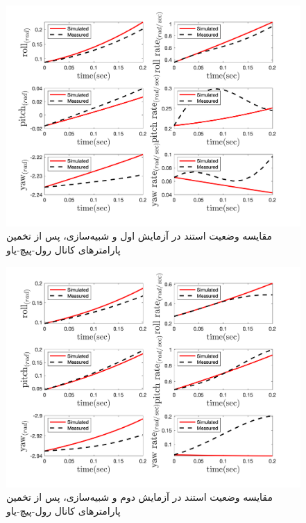 \begin{figure}[H]
	\includegraphics[width=12cm]{../Figures/RCP/roll_pitch_yaw_parameter_estimation/RCP_roll_pitch_yaw_S1.png}
	\centering
	\caption{مقايسه وضعیت استند در  آزمايش اول و شبیه‌سازی، پس از تخمین پارامترهای کانال رول-پیچ-یاو}
	\label{ roll_pitch_yaw_ps1}
\end{figure}
\begin{figure}[H]
	\includegraphics[width=12cm]{../Figures/RCP/roll_pitch_yaw_parameter_estimation/RCP_roll_pitch_yaw_S2.png}
	\centering
	\caption{مقايسه وضعیت استند در  آزمايش دوم و شبیه‌سازی، پس از تخمین پارامترهای کانال رول-پیچ-یاو}
	\label{ roll_pitch_yaw_ps2}
\end{figure}
